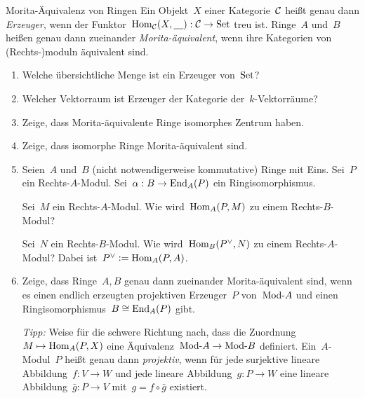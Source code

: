 \documentclass{uebblatt}
\begin{document}
\begin{aufgabe}{Morita-Äquivalenz von Ringen
}
Ein Objekt~$X$ einer Kategorie~$\mathcal{C}$ heißt genau dann \emph{Erzeuger}, wenn der
Funktor~$\mathrm{Hom}_{\mathcal{C}}(X, \underline{\quad}) : \mathcal{C} \to \mathrm{Set}$ treu ist. Ringe~$A$
und~$B$ heißen genau dann zueinander \emph{Morita-äquivalent}, wenn ihre
Kategorien von (Rechts-)moduln äquivalent sind.

\begin{enumerate}
\item Welche übersichtliche Menge ist ein Erzeuger von~$\mathrm{Set}$?
\item Welcher Vektorraum ist Erzeuger der Kategorie der~$k$-Vektorräume?
\item Zeige, dass Morita-äquivalente Ringe isomorphes Zentrum haben.
\item Zeige, dass isomorphe Ringe Morita-äquivalent sind.
\item Seien~$A$ und~$B$ (nicht notwendigerweise kommutative) Ringe mit Eins.
Sei~$P$ ein Rechts-$A$-Modul. Sei~$\alpha : B \to \mathrm{End}_A(P)$ ein
Ringisomorphismus.

Sei~$M$ ein Rechts-$A$-Modul. Wie wird~$\mathrm{Hom}_A(P,M)$ zu einem Rechts-$B$-Modul?

Sei~$N$ ein Rechts-$B$-Modul. Wie wird~$\mathrm{Hom}_B(P^\vee,N)$ zu einem
Rechts-$A$-Modul? Dabei ist~$P^\vee \vcentcolon= \mathrm{Hom}_A(P,A)$.

\item Zeige, dass Ringe~$A,B$ genau dann zueinander Morita-äquivalent sind,
wenn es einen endlich erzeugten projektiven Erzeuger~$P$ von~$\mathrm{Mod}\text{-}A$ und
einen Ringisomorphismus~$B \cong \mathrm{End}_A(P)$ gibt.

\emph{Tipp:} Weise für die schwere Richtung nach, dass die Zuordnung~$M \mapsto
\mathrm{Hom}_A(P,X)$ eine Äquivalenz~$\mathrm{Mod}\text{-}A \to \mathrm{Mod}\text{-}B$ definiert.
Ein~$A$-Modul~$P$ heißt genau dann \emph{projektiv}, wenn für jede surjektive lineare
Abbildung~$f : V \to W$ und jede lineare Abbildung~$g : P \to W$ eine lineare
Abbildung~$\bar g : P \to V$ mit~$g = f \circ \bar g$ existiert.
\end{enumerate}
\end{aufgabe}
\end{document}
